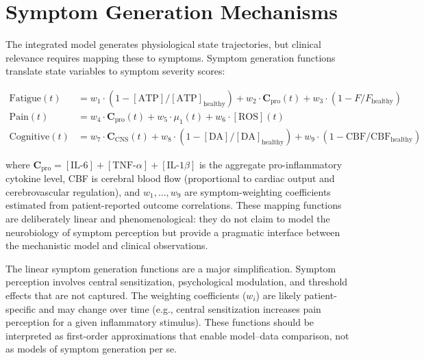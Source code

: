 \section{Symptom Generation Mechanisms}
\label{sec:symptom-generation}

The integrated model generates physiological state trajectories, but clinical relevance requires mapping these to symptoms. Symptom generation functions translate state variables to symptom severity scores:

\begin{align}
\label{eq:symptom-mapping}
\text{Fatigue}(t) &= w_1 \cdot (1 - [\text{ATP}]/[\text{ATP}]_{\text{healthy}}) + w_2 \cdot \boldsymbol{C}_{\text{pro}}(t) + w_3 \cdot (1 - F/F_{\text{healthy}}) \\
\text{Pain}(t) &= w_4 \cdot \boldsymbol{C}_{\text{pro}}(t) + w_5 \cdot \mu_1(t) + w_6 \cdot [\text{ROS}](t) \\
\text{Cognitive}(t) &= w_7 \cdot \boldsymbol{C}_{\text{CNS}}(t) + w_8 \cdot (1 - [\text{DA}]/[\text{DA}]_{\text{healthy}}) + w_9 \cdot (1 - \text{CBF}/\text{CBF}_{\text{healthy}})
\end{align}

where $\boldsymbol{C}_{\text{pro}} = [\text{IL-6}] + [\text{TNF-}\alpha] + [\text{IL-1}\beta]$ is the aggregate pro-inflammatory cytokine level, CBF is cerebral blood flow (proportional to cardiac output and cerebrovascular regulation), and $w_1, \ldots, w_9$ are symptom-weighting coefficients estimated from patient-reported outcome correlations. These mapping functions are deliberately linear and phenomenological: they do not claim to model the neurobiology of symptom perception but provide a pragmatic interface between the mechanistic model and clinical observations.

\begin{limitation}
The linear symptom generation functions are a major simplification. Symptom perception involves central sensitization, psychological modulation, and threshold effects that are not captured. The weighting coefficients ($w_i$) are likely patient-specific and may change over time (e.g., central sensitization increases pain perception for a given inflammatory stimulus). These functions should be interpreted as first-order approximations that enable model--data comparison, not as models of symptom generation per se.
\end{limitation}

